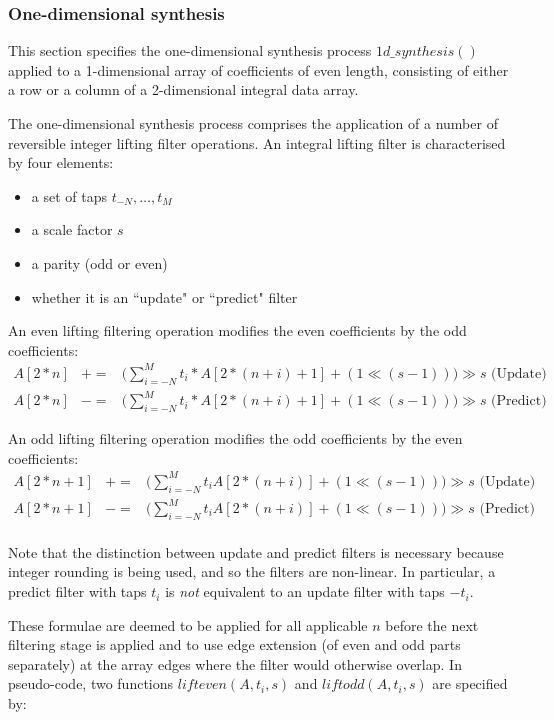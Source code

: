 \subsubsection{One-dimensional synthesis}
\label{onedsynth}

This section specifies the one-dimensional synthesis process
$1d\_synthesis()$ applied to a 1-dimensional array of coefficients of
even length, consisting
of either a row or a column of a 2-dimensional integral data array.

The one-dimensional synthesis process comprises the application of a
number of reversible integer lifting filter operations. An integral lifting filter
 is characterised by four elements:
\begin{itemize}
\item a set of taps $t_{-N}, \hdots,t_M$
\item a scale factor $s$
\item a parity (odd or even)
\item whether it is an ``update" or ``predict" filter
\end{itemize}

An even lifting filtering operation modifies the even coefficients
by the odd coefficients:
\begin{eqnarray*}
  A[2*n]& +=& \big( \sum^M_{i=-N} t_i *A[2*(n+i) + 1] +(1\ll (s-1))\big) \gg s \mbox{ (Update)} \\
  A[2*n]& -=& \big( \sum^M_{i=-N} t_i *A[2*(n+i) + 1] +(1\ll (s-1))\big) \gg s \mbox{ (Predict)}
\end{eqnarray*}

An odd lifting filtering operation modifies the odd coefficients
 by the even coefficients:
\begin{eqnarray*}
  A[2*n+1]& +=&  \big( \sum^M_{i=-N} t_i A[2*(n+i)]+(1\ll (s-1)) \big) \gg s \mbox{ (Update)} \\
  A[2*n+1]& -=&  \big( \sum^M_{i=-N} t_i A[2*(n+i)] +(1\ll (s-1))\big) \gg s \mbox{ (Predict)} \\
\end{eqnarray*}

\begin{informative}
Note that the distinction between update and predict filters is necessary
because integer rounding is being used, and so the filters are non-linear.
In particular, a predict filter with taps $t_i$ is {\em not} equivalent to 
an update filter with taps $-t_i$.
\end{informative}

These formulae are deemed to be applied for all applicable $n$
before the next filtering stage is applied and to use edge extension (of even and
odd parts separately) at the array
edges where the filter would otherwise overlap. In pseudo-code, two
functions $lifteven(A, t_i, s)$ and $liftodd(A, t_i, s)$ are specified by:

